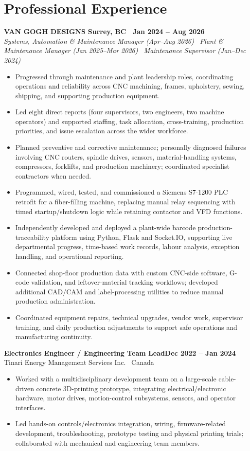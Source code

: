 \documentclass[10pt,letterpaper]{article}
\newcommand{\job}[3]{\vspace{3pt}\textbf{#1}\hfill\textbf{#2}\\[-1pt]{\color{muted}#3}\vspace{1pt}}
\begin{document}
\section{Professional Experience}
\textbf{VAN GOGH DESIGNS} \hfill \textbf{Surrey, BC \textbar\ Jan 2024 -- Aug 2026}\\[-1pt]
{\color{muted}\textit{Systems, Automation \& Maintenance Manager (Apr--Aug 2026) \textbar\ Plant \& Maintenance Manager (Jan 2025--Mar 2026) \textbar\ Maintenance Supervisor (Jan--Dec 2024)}}
\begin{itemize}
\item Progressed through maintenance and plant leadership roles, coordinating operations and reliability across CNC machining, frames, upholstery, sewing, shipping, and supporting production equipment.
\item Led eight direct reports (four supervisors, two engineers, two machine operators) and supported staffing, task allocation, cross-training, production priorities, and issue escalation across the wider workforce.
\item Planned preventive and corrective maintenance; personally diagnosed failures involving CNC routers, spindle drives, sensors, material-handling systems, compressors, forklifts, and production machinery; coordinated specialist contractors when needed.
\item Programmed, wired, tested, and commissioned a Siemens S7-1200 PLC retrofit for a fiber-filling machine, replacing manual relay sequencing with timed startup/shutdown logic while retaining contactor and VFD functions.
\item Independently developed and deployed a plant-wide barcode production-traceability platform using Python, Flask and Socket.IO, supporting live departmental progress, time-based work records, labour analysis, exception handling, and operational reporting.
\item Connected shop-floor production data with custom CNC-side software, G-code validation, and leftover-material tracking workflows; developed additional CAD/CAM and label-processing utilities to reduce manual production administration.
\item Coordinated equipment repairs, technical upgrades, vendor work, supervisor training, and daily production adjustments to support safe operations and manufacturing continuity.
\end{itemize}
\job{Electronics Engineer / Engineering Team Lead}{Dec 2022 -- Jan 2024}{Tinari Energy Management Services Inc. \textbar\ Canada}
\begin{itemize}
\item Worked with a multidisciplinary development team on a large-scale cable-driven concrete 3D-printing prototype, integrating electrical/electronic hardware, motor drives, motion-control subsystems, sensors, and operator interfaces.
\item Led hands-on controls/electronics integration, wiring, firmware-related development, troubleshooting, prototype testing and physical printing trials; collaborated with mechanical and engineering team members.
\end{itemize}
\newpage
\end{document}
